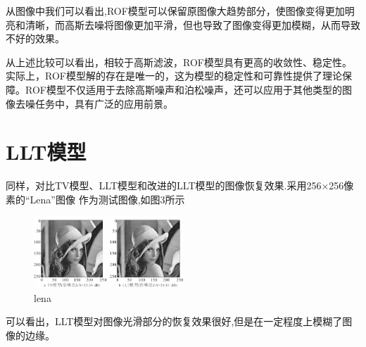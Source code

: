 从图像中我们可以看出,ROF模型可以保留原图像大趋势部分，使图像变得更加明亮和清晰，而高斯去噪将图像更加平滑，但也导致了图像变得更加模糊，从而导致不好的效果。

从上述比较可以看出，相较于高斯滤波，ROF模型具有更高的收敛性、稳定性。实际上，ROF模型解的存在是唯一的，这为模型的稳定性和可靠性提供了理论保障。\cite{rudin1994total}ROF模型不仅适用于去除高斯噪声和泊松噪声，还可以应用于其他类型的图像去噪任务中，具有广泛的应用前景。

\section{LLT模型}
同样，对比TV模型、LLT模型和改进的LLT模型的图像恢复效果.采用256×256像素的“Lena”图像
作为测试图像,如图3所示
\begin{figure}[ht]
    \centering
    \includegraphics[width=0.5\textwidth]{Images/lena.png}
    \vspace{-1em}
    \caption{lena\cite{JSDN201705008}}
    \label{fig:synthesis_evaluation}
\end{figure}
\FloatBarrier
可以看出，LLT模型对图像光滑部分的恢复效果很好,但是在一定程度上模糊了图像的边缘。